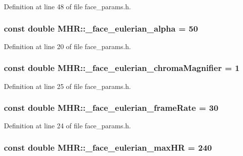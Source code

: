 Definition at line 48 of file face\+\_\+params.\+h.

\hypertarget{namespace_m_h_r_a0f9c0b966020cdd7ef37cb2207d981ab}{
\subsubsection[{\+\_\+face\+\_\+eulerian\+\_\+alpha}]{\setlength{\rightskip}{0pt plus 5cm}const double M\+H\+R\+::\+\_\+face\+\_\+eulerian\+\_\+alpha = 50}}\label{namespace_m_h_r_a0f9c0b966020cdd7ef37cb2207d981ab}


Definition at line 20 of file face\+\_\+params.\+h.

\hypertarget{namespace_m_h_r_a5b039641e0cf1a30ba4f303e4764b4c8}{
\subsubsection[{\+\_\+face\+\_\+eulerian\+\_\+chroma\+Magnifier}]{\setlength{\rightskip}{0pt plus 5cm}const double M\+H\+R\+::\+\_\+face\+\_\+eulerian\+\_\+chroma\+Magnifier = 1}}\label{namespace_m_h_r_a5b039641e0cf1a30ba4f303e4764b4c8}


Definition at line 25 of file face\+\_\+params.\+h.

\hypertarget{namespace_m_h_r_a3c21f6619922e618bff40700a5723015}{
\subsubsection[{\+\_\+face\+\_\+eulerian\+\_\+frame\+Rate}]{\setlength{\rightskip}{0pt plus 5cm}const double M\+H\+R\+::\+\_\+face\+\_\+eulerian\+\_\+frame\+Rate = 30}}\label{namespace_m_h_r_a3c21f6619922e618bff40700a5723015}


Definition at line 24 of file face\+\_\+params.\+h.

\hypertarget{namespace_m_h_r_a366f66e2cd387cf039dc5d7de4ff5f9d}{
\subsubsection[{\+\_\+face\+\_\+eulerian\+\_\+max\+H\+R}]{\setlength{\rightskip}{0pt plus 5cm}const double M\+H\+R\+::\+\_\+face\+\_\+eulerian\+\_\+max\+H\+R = 240}}\label{namespace_m_h_r_a366f66e2cd387cf039dc5d7de4ff5f9d}



